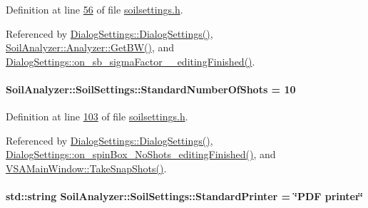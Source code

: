 Definition at line \hyperlink{soilsettings_8h_source_l00056}{56} of file \hyperlink{soilsettings_8h_source}{soilsettings.\+h}.



Referenced by \hyperlink{dialogsettings_8cpp_source_l00005}{Dialog\+Settings\+::\+Dialog\+Settings()}, \hyperlink{analyzer_8cpp_source_l00236}{Soil\+Analyzer\+::\+Analyzer\+::\+Get\+B\+W()}, and \hyperlink{dialogsettings_8cpp_source_l00397}{Dialog\+Settings\+::on\+\_\+sb\+\_\+sigma\+Factor\+\_\+\_\+editing\+Finished()}.

\hypertarget{class_soil_analyzer_1_1_soil_settings_a290567ffd8fe54f1c800654395ca7a71}{}
\paragraph[{Standard\+Number\+Of\+Shots}]{ Soil\+Analyzer\+::\+Soil\+Settings\+::\+Standard\+Number\+Of\+Shots = 10}\label{class_soil_analyzer_1_1_soil_settings_a290567ffd8fe54f1c800654395ca7a71}


Definition at line \hyperlink{soilsettings_8h_source_l00103}{103} of file \hyperlink{soilsettings_8h_source}{soilsettings.\+h}.



Referenced by \hyperlink{dialogsettings_8cpp_source_l00005}{Dialog\+Settings\+::\+Dialog\+Settings()}, \hyperlink{dialogsettings_8cpp_source_l00511}{Dialog\+Settings\+::on\+\_\+spin\+Box\+\_\+\+No\+Shots\+\_\+editing\+Finished()}, and \hyperlink{vsamainwindow_8cpp_source_l00391}{V\+S\+A\+Main\+Window\+::\+Take\+Snap\+Shots()}.

\hypertarget{class_soil_analyzer_1_1_soil_settings_a5cc51f50ef63440c6f65e2a9a6562be8}{}
\paragraph[{Standard\+Printer}]{\setlength{\rightskip}{0pt plus 5cm}std\+::string Soil\+Analyzer\+::\+Soil\+Settings\+::\+Standard\+Printer = \char`\"{}P\+D\+F printer\char`\"{}}\label{class_soil_analyzer_1_1_soil_settings_a5cc51f50ef63440c6f65e2a9a6562be8}


